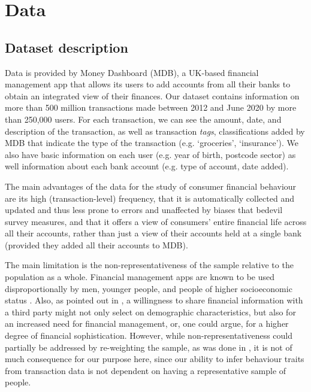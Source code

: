 
\section{Data}%
\label{sec:data}


\subsection{Dataset description}
\label{sub:dataset_description}
Data is provided by Money Dashboard (MDB), a UK-based
financial management app that allows its users to add accounts from all
their banks to obtain an integrated view of their finances. Our
dataset contains information on more than 500 million transactions made between
2012 and June 2020 by more than 250,000 users. For each transaction, we can see
the amount, date, and description of the transaction, as well as transaction
\textit{tags}, classifications added by MDB that indicate the type of the
transaction (e.g.  `groceries', `insurance'). We also have basic information
 on each user (e.g. year of birth, postcode sector) as well information about
each bank account (e.g. type of account, date added).

The main advantages of the data for the study of consumer financial behaviour
are its high (transaction-level) frequency, that it is automatically
collected and updated and thus less prone to errors and unaffected by biases
that bedevil survey measures, and that it offers a view of consumers' entire
financial life across all their accounts, rather than just a view of their
accounts held at a single bank (provided they added all their accounts to MDB).

The main limitation is the non-representativeness of the sample relative to the
population as a whole. Financial management apps are known to be used
disproportionally by men, younger people, and people of higher socioeconomic
status \citep{carlin2019generational,mas2014money}. Also, as pointed out in
\citet{gelman2014harnessing}, a willingness to share financial information with
a third party might not only select on demographic characteristics, but also
for an increased need for financial management, or, one could argue, for a
higher degree of financial sophistication. However, while
non-representativeness could partially be addressed by re-weighting the sample,
as was done in \citet{bhourquin2020effects}, it is not of much consequence for
our purpose here, since our ability to infer behaviour traits from transaction
data is not dependent on having a representative sample of people.


